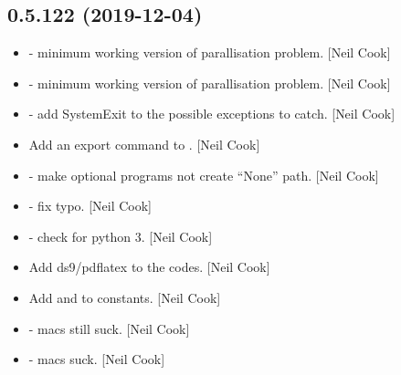 \documentclass[a4paper,10pt,english]{report}
\begin{document}
\subsection{0.5.122 (2019-12-04)}
\label{\detokenize{misc/changelog:id20}}\begin{itemize}
\item {} 
 - minimum working version of
parallisation problem. {[}Neil Cook{]}

\item {} 
 - minimum working version of
parallisation problem. {[}Neil Cook{]}

\item {} 
 - add SystemExit to the possible exceptions
to catch. {[}Neil Cook{]}

\item {} 
Add an export command to . {[}Neil Cook{]}

\item {} 
 - make optional programs not
create “None” path. {[}Neil Cook{]}

\item {} 
 - fix typo. {[}Neil Cook{]}

\item {} 
 - check for python 3. {[}Neil Cook{]}

\item {} 
Add ds9/pdflatex to the codes. {[}Neil Cook{]}

\item {} 
Add  and  to constants. {[}Neil Cook{]}

\item {} 
 - macs still suck. {[}Neil Cook{]}

\item {} 
 - macs suck. {[}Neil Cook{]}

\end{itemize}
\end{document}
